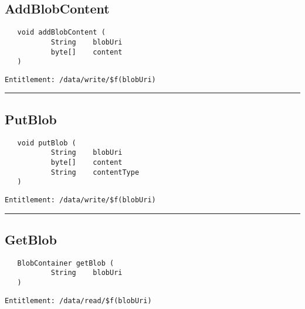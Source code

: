 \subsection{AddBlobContent}
\label{Api:AddBlobContent}
\begin{verbatim}
   void addBlobContent (
           String    blobUri
           byte[]    content
   )
\end{verbatim}
\begin{Verbatim}[fontsize=\small, formatcom=\color{Maroon}]
  Entitlement: /data/write/$f(blobUri)
\end{Verbatim}



\rule{12cm}{2pt}
\subsection{PutBlob}
\label{Api:PutBlob}
\begin{verbatim}
   void putBlob (
           String    blobUri
           byte[]    content
           String    contentType
   )
\end{verbatim}
\begin{Verbatim}[fontsize=\small, formatcom=\color{Maroon}]
  Entitlement: /data/write/$f(blobUri)
\end{Verbatim}



\rule{12cm}{2pt}
\subsection{GetBlob}
\label{Api:GetBlob}
\begin{verbatim}
   BlobContainer getBlob (
           String    blobUri
   )
\end{verbatim}
\begin{Verbatim}[fontsize=\small, formatcom=\color{Maroon}]
  Entitlement: /data/read/$f(blobUri)
\end{Verbatim}



